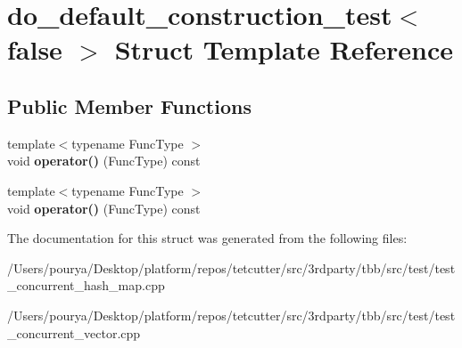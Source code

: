 \hypertarget{structdo__default__construction__test_3_01false_01_4}{}\section{do\+\_\+default\+\_\+construction\+\_\+test$<$ false $>$ Struct Template Reference}
\label{structdo__default__construction__test_3_01false_01_4}
\subsection*{Public Member Functions}
\begin{DoxyCompactItemize}
\item 
\hypertarget{structdo__default__construction__test_3_01false_01_4_a63a1c96f7734c35e95881bb37c228cf7}{}{\footnotesize template$<$typename Func\+Type $>$ }\\void {\bfseries operator()} (Func\+Type) const \label{structdo__default__construction__test_3_01false_01_4_a63a1c96f7734c35e95881bb37c228cf7}

\item 
\hypertarget{structdo__default__construction__test_3_01false_01_4_a63a1c96f7734c35e95881bb37c228cf7}{}{\footnotesize template$<$typename Func\+Type $>$ }\\void {\bfseries operator()} (Func\+Type) const \label{structdo__default__construction__test_3_01false_01_4_a63a1c96f7734c35e95881bb37c228cf7}

\end{DoxyCompactItemize}


The documentation for this struct was generated from the following files\+:\begin{DoxyCompactItemize}
\item 
/\+Users/pourya/\+Desktop/platform/repos/tetcutter/src/3rdparty/tbb/src/test/test\+\_\+concurrent\+\_\+hash\+\_\+map.\+cpp\item 
/\+Users/pourya/\+Desktop/platform/repos/tetcutter/src/3rdparty/tbb/src/test/test\+\_\+concurrent\+\_\+vector.\+cpp\end{DoxyCompactItemize}
